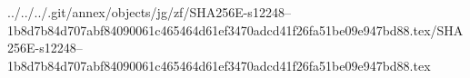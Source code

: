 ../../../.git/annex/objects/jg/zf/SHA256E-s12248--1b8d7b84d707abf84090061c465464d61ef3470adcd41f26fa51be09e947bd88.tex/SHA256E-s12248--1b8d7b84d707abf84090061c465464d61ef3470adcd41f26fa51be09e947bd88.tex